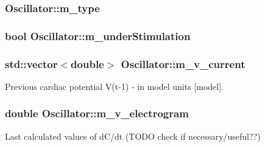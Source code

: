 \hypertarget{class_oscillator_a7553dcea69896c2f3ff2bc8bda1d05cc}{
\subsubsection[{m\+\_\+type}]{ Oscillator\+::m\+\_\+type}}\label{class_oscillator_a7553dcea69896c2f3ff2bc8bda1d05cc}
\hypertarget{class_oscillator_aeaa03f804f9d13f27635b94ea7a6bd32}{
\subsubsection[{m\+\_\+under\+Stimulation}]{\setlength{\rightskip}{0pt plus 5cm}bool Oscillator\+::m\+\_\+under\+Stimulation}}\label{class_oscillator_aeaa03f804f9d13f27635b94ea7a6bd32}
\hypertarget{class_oscillator_a344928736ed0deb40bc1c73d50af5d33}{
\subsubsection[{m\+\_\+v\+\_\+current}]{\setlength{\rightskip}{0pt plus 5cm}std\+::vector$<$double$>$ Oscillator\+::m\+\_\+v\+\_\+current}}\label{class_oscillator_a344928736ed0deb40bc1c73d50af5d33}


Previous cardiac potential V(t-\/1) -\/ in model units \mbox{[}model\mbox{]}. 

\hypertarget{class_oscillator_ab65a59d93c248616facbd1f01b3c2b87}{
\subsubsection[{m\+\_\+v\+\_\+electrogram}]{\setlength{\rightskip}{0pt plus 5cm}double Oscillator\+::m\+\_\+v\+\_\+electrogram}}\label{class_oscillator_ab65a59d93c248616facbd1f01b3c2b87}


Last calculated values of d\+C/dt (T\+O\+D\+O check if necessary/useful??) 

